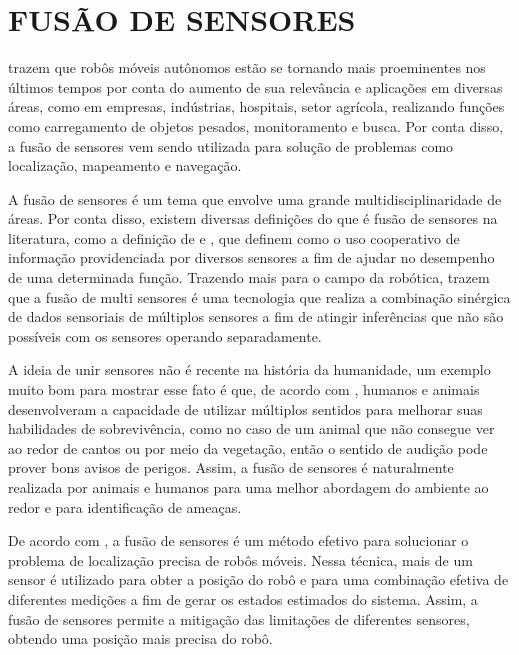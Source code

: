 \documentclass[acronym, symbols, table]{fei}
\begin{document}
	\section{FUSÃO DE SENSORES}
	
		\textcite{alatise2020review} trazem que robôs móveis autônomos estão se tornando mais proeminentes nos últimos tempos por conta do aumento de sua relevância e aplicações em diversas áreas, como em empresas, indústrias, hospitais, setor agrícola, realizando funções como carregamento de objetos pesados, monitoramento e busca. Por conta disso, a fusão de sensores vem sendo utilizada para solução de problemas como localização, mapeamento e navegação.
		
		A fusão de sensores é um tema que envolve uma grande multidisciplinaridade de áreas. Por conta disso, existem diversas definições do que é fusão de sensores na literatura, como a definição de \textcite{castanedo2013review} e \textcite{nagla2014multisensor}, que definem como o uso cooperativo de informação providenciada por diversos sensores a fim de ajudar no desempenho de uma determinada função. Trazendo mais para o campo da robótica, \textcite{luo2011multisensor} trazem que a fusão de multi sensores é uma tecnologia que realiza a combinação sinérgica de dados sensoriais de múltiplos sensores a fim de atingir inferências que não são possíveis com os sensores operando separadamente.
		
		A ideia de unir sensores não é recente na história da humanidade, um exemplo muito bom para mostrar esse fato é que, de acordo com \textcite{hall1997introduction}, humanos e animais desenvolveram a capacidade de utilizar múltiplos sentidos para melhorar suas habilidades de sobrevivência, como no caso de um animal que não consegue ver ao redor de cantos ou por meio da vegetação, então o sentido de audição pode prover bons avisos de perigos. Assim, a fusão de sensores é naturalmente realizada por animais e humanos para uma melhor abordagem do ambiente ao redor e para identificação de ameaças.
		
		De acordo com \textcite{marton2013two}, a fusão de sensores é um método efetivo para solucionar o problema de localização precisa de robôs móveis. Nessa técnica, mais de um sensor é utilizado para obter a posição do robô e para uma combinação efetiva de diferentes medições a fim de gerar os estados estimados do sistema. Assim, a fusão de sensores permite a mitigação das limitações de diferentes sensores, obtendo uma posição mais precisa do robô.
		
\end{document}

